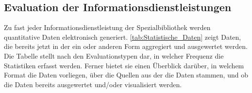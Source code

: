 \subsection{Evaluation der Informationsdienstleistungen}

Zu fast jeder Informationsdienstleistung der Spezialbibliothek werden quantitative Daten elektronisch generiert. 
\autoref{tab:Statistische_Daten} zeigt Daten, die bereits jetzt in der ein oder anderen Form aggregiert und ausgewertet werden. 
Die Tabelle stellt nach den Evaluationstypen dar, in welcher Frequenz die Statistiken erfasst werden. Ferner bietet sie einen Überblick darüber, in welchem 
Format die Daten vorliegen, über die Quellen aus der die Daten stammen, und ob die Daten bereits ausgewertet und/oder visualisiert werden.


\begingroup
\setlength{\tabcolsep}{4pt} %
